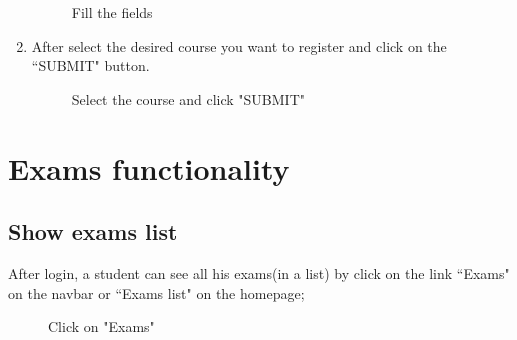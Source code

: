 \documentclass[ManualeUtente]{subfiles}
\begin{document}
\begin{enumerate}
\begin{figure}[H]
		\caption{Fill the fields}
		\label{fig:Fill the fields}
	\end{figure}
	\item After select the desired course you want to register and click on the \textquotedblleft SUBMIT" button.
	\begin{figure}[H]
		\centering
		\caption{Select the course and click "SUBMIT"}
		\label{fig:Select the course and click "SUBMIT"}
	\end{figure}
\end{enumerate}

\newpage
\section{Exams functionality}
\subsection{Show exams list}
After login, a student can see all his exams(in a list) by click on the link \textquotedblleft Exams" on the navbar or \textquotedblleft Exams list" on the homepage;
	\begin{figure}[H]
		\centering
		\caption{Click on "Exams"}
		\label{fig:Click on "Exams"}
	\end{figure}
\end{document}
